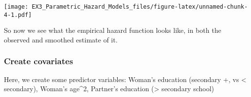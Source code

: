 \documentclass[
]{article}
\newenvironment{Shaded}{\begin{snugshade}}{\end{snugshade}}
\newcommand{\DataTypeTok}[1]{\textcolor[rgb]{0.13,0.29,0.53}{#1}}
\newcommand{\DecValTok}[1]{\textcolor[rgb]{0.00,0.00,0.81}{#1}}
\newcommand{\KeywordTok}[1]{\textcolor[rgb]{0.13,0.29,0.53}{\textbf{#1}}}
\newcommand{\NormalTok}[1]{#1}
\newcommand{\OperatorTok}[1]{\textcolor[rgb]{0.81,0.36,0.00}{\textbf{#1}}}
\newcommand{\OtherTok}[1]{\textcolor[rgb]{0.56,0.35,0.01}{#1}}
\newcommand{\StringTok}[1]{\textcolor[rgb]{0.31,0.60,0.02}{#1}}
\begin{document}
\texttt{[image: EX3\_Parametric\_Hazard\_Models\_files/figure-latex/unnamed-chunk-4-1.pdf]}

So now we see what the empirical hazard function looks like, in both the
observed and smoothed estimate of it.

\hypertarget{create-covariates}{%
\subsubsection{Create covariates}\label{create-covariates}}

Here, we create some predictor variables: Woman's education (secondary
+, vs \textless{} secondary), Woman's age\^{}2, Partner's education
(\textgreater{} secondary school)

\begin{Shaded}
\end{Shaded}
\end{document}
